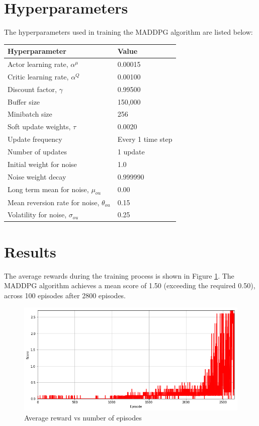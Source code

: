 \documentclass[12pt,twoside]{article}
\begin{document}
\section{Hyperparameters}
The hyperparameters used in training the MADDPG algorithm are listed below:
\begin{center}
	\begin{tabular}{|l|l|}
	\hline
		\textbf{Hyperparameter}							& \textbf{Value}\\\hline
		Actor learning rate, $\alpha^\mu$				& 0.00015 \\
		Critic learning rate, $\alpha^Q$					& 0.00100 \\
		Discount factor, $\gamma$						& 0.99500 \\
		Buffer size												& 150,000\\
		Minibatch size											& 256\\
		Soft update weights, $\tau$						& 0.0020\\
		Update frequency										& Every 1 time step\\
		Number of updates									& 1 update\\
		Initial weight for noise								& 1.0\\
		Noise weight decay									& 0.999990\\
		Long term mean for noise, $\mu_{ou}$		& 0.00\\
		Mean reversion rate for noise, $\theta_{ou}$	& 0.15\\
		Volatility for noise, $\sigma_{ou}$				& 0.25\\\hline
	\end{tabular}
\end{center}

\section{Results}
	
The average rewards during the training process is shown in Figure \ref{fig:results}. The MADDPG algorithm achieves a mean score of 1.50  (exceeding the required 0.50), across 100 episodes after 2800 episodes. 
	
\begin{figure}[H]
	\begin{center}
		\includegraphics[width = 0.8\hsize]{./figures/results.png} 
		\caption{Average reward vs number of episodes} %
		\label{fig:results} %
	\end{center}
\end{figure}
\end{document}
